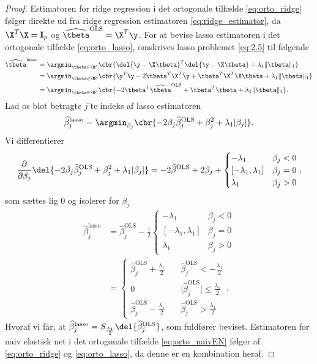 \begin{proof}
Estimatoren for ridge regression i det ortogonale tilfælde \eqref{eq:orto_ridge} følger direkte ud fra ridge regression estimatoren \eqref{eq:ridge_estimator}, da \(\X^T \X = \mathbf{I}_p\) og \(\widehat{\tbeta}^\text{OLS} = \X^T \y\).
For at bevise lasso estimatoren i det ortogonale tilfælde \eqref{eq:orto_lasso}, omskrives lasso problemet \eqref{eq:2.5} til følgende
\begin{align*}
\widehat{\tbeta}^\text{lasso} &= \argmin_{\tbeta \in \R^p} \cbr{\del{\y - \X \tbeta}^T \del{\y - \X \tbeta} + \lambda_1 \Vert \tbeta \Vert_1} \\
&= \argmin_{\tbeta \in \R^p} \cbr{ \y^T \y - 2 \tbeta^T \X^T \y + \tbeta^T \X^T \X \tbeta + \lambda_1 \Vert \tbeta \Vert_1} \\
&= \argmin_{\tbeta \in \R^p} \cbr{- 2 \tbeta^T \widehat{\tbeta}^\text{OLS} + \tbeta^T \tbeta + \lambda_1 \Vert \tbeta \Vert_1}.
\end{align*}
Lad os blot betragte \(j\)'te indeks af lasso estimatoren
\begin{align*}
\widehat{\beta}_j^\text{lasso} = \argmin_{\beta_j} \cbr{ - 2 \beta_j \widehat{\beta}_j^\text{OLS} + \beta_j^2 + \lambda_1 \vert \beta_j \vert}.
\end{align*}
Vi differentierer
\begin{align*}
\frac{\partial}{\partial \beta_j} \del{- 2 \beta_j \widehat{\beta}_j^\text{OLS} + \beta_j^2 + \lambda_1 \vert \beta_j \vert}
=-2\widehat{\beta}^\text{OLS} + 2\beta_j + \begin{cases}
-\lambda_1 \quad &\beta_j < 0 \\
[-\lambda_1, \lambda_1] & \beta_j = 0 \\
\lambda_1 & \beta_j >0 
\end{cases},
\end{align*}
som sættes lig \(0\) og isolerer for \(\beta_j\)
\begin{align*}
\widehat{\beta}_j^\text{lasso} &= \widehat{\beta}_j^\text{OLS} - \frac{1}{2}\begin{cases}
-\lambda_1 \quad &\beta_j < 0 \\
[-\lambda_1, \lambda_1] & \beta_j = 0 \\
\lambda_1 & \beta_j >0 
\end{cases} \\
&= \begin{cases}
\widehat{\beta}_j^\text{OLS} + \frac{\lambda_1}{2} \quad &\widehat{\beta}_j^\text{OLS} < - \frac{\lambda_1}{2} \\
0 & \vert\widehat{\beta}_j^\text{OLS} \vert \leq \frac{\lambda_1}{2} \\
\widehat{\beta}_j^\text{OLS} - \frac{\lambda_1}{2} \quad &\widehat{\beta}_j^\text{OLS} > \frac{\lambda_1}{2}
\end{cases}. 
\end{align*}
Hvoraf vi får, at \(\widehat{\beta}_j^\text{lasso} = S_{\frac{\lambda_1}{2}} \del{ \widehat{\beta}_j^\text{OLS}} \), som fuldfører beviset.
Estimatoren for naiv elastisk net i det ortogonale tilfælde \eqref{eq:orto_naivEN} følger af \eqref{eq:orto_ridge} og \eqref{eq:orto_lasso}, da denne er en kombination heraf.
\end{proof}
